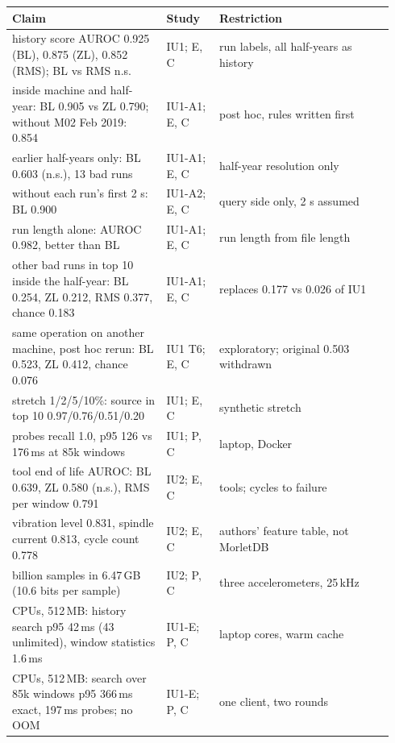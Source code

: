 \documentclass[sigconf]{acmart}
\newcommand{\M}{MorletDB}
\begin{document}
\medskip\noindent
\begin{longtable}{@{}>{\raggedright\arraybackslash}p{0.38\linewidth}p{0.13\linewidth}>{\raggedright\arraybackslash}p{0.43\linewidth}@{}}
\toprule
Claim & Study & Restriction \\
\midrule\endhead
history score AUROC 0.925 (BL), 0.875 (ZL), 0.852 (RMS); BL vs RMS n.s. & IU1; E, C & run labels, all half-years as history \\
inside machine and half-year: BL 0.905 vs ZL 0.790; without M02 Feb 2019: 0.854 & IU1-A1; E, C & post hoc, rules written first \\
earlier half-years only: BL 0.603 (n.s.), 13 bad runs & IU1-A1; E, C & half-year resolution only \\
without each run's first 2 s: BL 0.900 & IU1-A2; E, C & query side only, 2 s assumed \\
run length alone: AUROC 0.982, better than BL & IU1-A1; E, C & run length from file length \\
other bad runs in top 10 inside the half-year: BL 0.254, ZL 0.212, RMS 0.377, chance 0.183 & IU1-A1; E, C & replaces 0.177 vs 0.026 of IU1 \\
same operation on another machine, post hoc rerun: BL 0.523, ZL 0.412, chance 0.076 & IU1 T6; E, C & exploratory; original 0.503 withdrawn \\
stretch 1/2/5/10\%: source in top 10 0.97/0.76/0.51/0.20 & IU1; E, C & synthetic stretch \\
probes recall 1.0, p95 126 vs 176\,ms at 85k windows & IU1; P, C & laptop, Docker \\
tool end of life AUROC: BL 0.639, ZL 0.580 (n.s.), RMS per window 0.791 & IU2; E, C & 7 tools; cycles to failure \\
vibration level 0.831, spindle current 0.813, cycle count 0.778 & IU2; E, C & authors' feature table, not \M{} \\
4.88 billion samples in 6.47\,GB (10.6 bits per sample) & IU2; P, C & three accelerometers, 25\,kHz \\
2 CPUs, 512\,MB: history search p95 42\,ms (43 unlimited), window statistics 1.6\,ms & IU1-E; P, C & laptop cores, warm cache \\
2 CPUs, 512\,MB: search over 85k windows p95 366\,ms exact, 197\,ms probes; no OOM & IU1-E; P, C & one client, two rounds \\
\bottomrule
\end{longtable}
\end{document}
